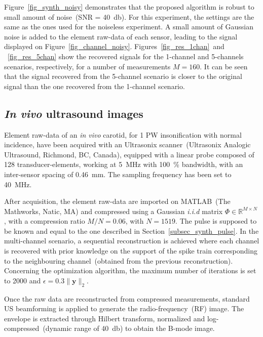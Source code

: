 \documentclass{article}
\newcommand{\vect}[1]{\bm{#1}}
\newcommand{\mat}[1]{\mathsf{#1}}
\theoremstyle{definition}
\begin{document}
Figure~\ref{fig_synth_noisy} demonstrates that the proposed algorithm is robust to small amount of noise~(SNR = \SI{40}{\decibel}). For this experiment, the settings are the same as the ones used for the noiseless experiment. A small amount of Gaussian noise is added to the element raw-data of each sensor, leading to the signal displayed on Figure~\ref{fig_channel_noisy}. Figures~\ref{fig_res_1chan}~and ~\ref{fig_res_5chan} show the recovered signals for the \num{1}-channel and \num{5}-channels scenarios, respectively, for a number of measurements $M=160$. It can be seen that the signal recovered from the \num{5}-channel scenario is closer to the original signal than the one recovered from the \num{1}-channel scenario.

\subsection{\textit{In vivo} ultrasound images}
\label{subsec_invivo_images}
Element raw-data of an \textit{in vivo} carotid, for 1 PW insonification with normal incidence, have been acquired with an Ultrasonix scanner~(Ultrasonix Analogic Ultrasound, Richmond, BC, Canada), equipped with a linear probe composed of \num{128} transducer-elements, working at \SI{5}{\mega\hertz} with \SI{100}{\percent} bandwidth, with an inter-sensor spacing of \SI{0.46}{\milli\metre}. The sampling frequency has been set to \SI{40}{\mega\hertz}. 

After acquisition, the element raw-data are imported on MATLAB~(The Mathworks, Natic, MA) and compressed using a Gaussian \textit{i.i.d} matrix $\mat{\Phi} \in \mathbb{R}^{M \times N}$, with a compression ratio $M/N = 0.06$, with $N=1519$. The pulse is supposed to be known and equal to the one described in Section~\ref{subsec_synth_pulse}. In the multi-channel scenario, a sequential reconstruction is achieved where each channel is recovered with prior knowledge on the support of the spike train corresponding to the neighbouring channel~(obtained from the previous reconstruction). Concerning the optimization algorithm, the maximum number of iterations is set to \num{2000} and $\epsilon = 0.3 \| \vect{y} \|_2$. 

Once the raw data are reconstructed from compressed measurements, standard US beamforming is applied to generate the radio-frequency~(RF) image. The envelope is extracted through Hilbert transform, normalized and log-compressed~(dynamic range of \SI{40}{\decibel}) to obtain the B-mode image. 
\end{document}
